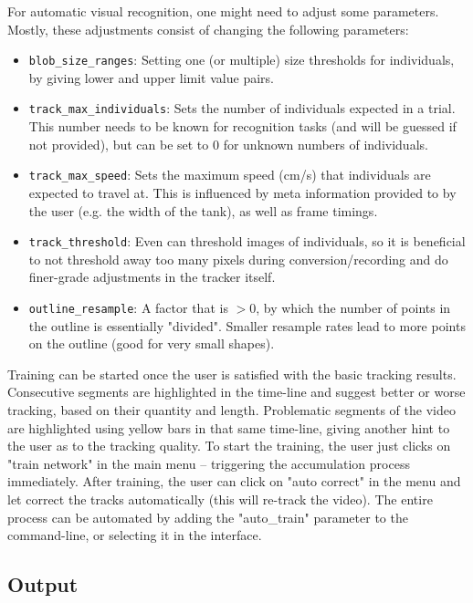 \documentclass[9pt,lineno]{elife}
\newcommand{\TRex}{\protect\path{TRex}}
\newcommand{\TGrabs}{\protect\path{TGrabs}}
\begin{document}
\begin{appendixbox}
For automatic visual recognition, one might need to adjust some parameters. Mostly, these adjustments consist of changing the following parameters:

\begin{itemize}
    \item \texttt{blob\_size\_ranges}: Setting one (or multiple) size thresholds for individuals, by giving lower and upper limit value pairs.
    \item \texttt{track\_max\_individuals}: Sets the number of individuals expected in a trial. This number needs to be known for recognition tasks (and will be guessed if not provided), but can be set to $0$ for unknown numbers of individuals.
    \item \texttt{track\_max\_speed}: Sets the maximum speed (cm/s) that individuals are expected to travel at. This is influenced by meta information provided to \TGrabs{} by the user (e.g. the width of the tank), as well as frame timings.
    \item \texttt{track\_threshold}: Even \TRex{} can threshold images of individuals, so it is beneficial to not threshold away too many pixels during conversion/recording and do finer-grade adjustments in the tracker itself.
    \item \texttt{outline\_resample}: A factor that is $>0$, by which the number of points in the outline is essentially "divided". Smaller resample rates lead to more points on the outline (good for very small shapes).
\end{itemize}

Training can be started once the user is satisfied with the basic tracking results. Consecutive segments are highlighted in the time-line and suggest better or worse tracking, based on their quantity and length. Problematic segments of the video are highlighted using yellow bars in that same time-line, giving another hint to the user as to the tracking quality. To start the training, the user just clicks on "train network" in the main menu -- triggering the accumulation process immediately. After training, the user can click on "auto correct" in the menu and let \TRex{} correct the tracks automatically (this will re-track the video). The entire process can be automated by adding the "auto\_train" parameter to the command-line, or selecting it in the interface.

\subsection{Output}


\end{appendixbox}
\end{document}
